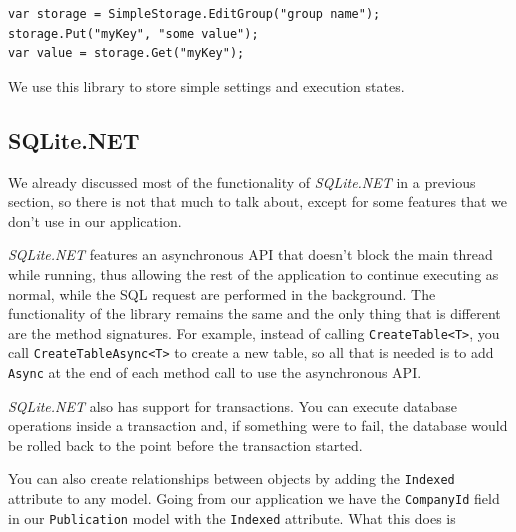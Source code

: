 \begin{lstlisting}[frame=lt,caption=SimpleStorage,label={list:store}]
var storage = SimpleStorage.EditGroup("group name");
storage.Put("myKey", "some value");
var value = storage.Get("myKey");
\end{lstlisting}

We use this library to store simple settings and execution states.


\subsection{SQLite.NET}
We already discussed most of the functionality of \textit{SQLite.NET} in a previous section, so there is not that much to talk about, except for some features that we don't use in our application.

\textit{SQLite.NET} features an asynchronous \ac{API} that doesn't block the main thread while running, thus allowing the rest of the application to continue executing as normal, while the SQL request are performed in the background. The functionality of the library remains the same and the only thing that is different are the method signatures. For example, instead of calling \texttt{CreateTable<T>}, you call \texttt{CreateTableAsync<T>} to create a new table, so all that is needed is to add \texttt{Async} at the end of each method call to use the asynchronous \ac{API}.

\textit{SQLite.NET} also has support for transactions. You can execute database operations inside a transaction and, if something were to fail, the database would be rolled back to the point before the transaction started.

You can also create relationships between objects by adding the \texttt{Indexed} attribute to any model. Going from our application we have the \texttt{CompanyId} field in our \texttt{Publication} model with the \texttt{Indexed} attribute. What this does is















